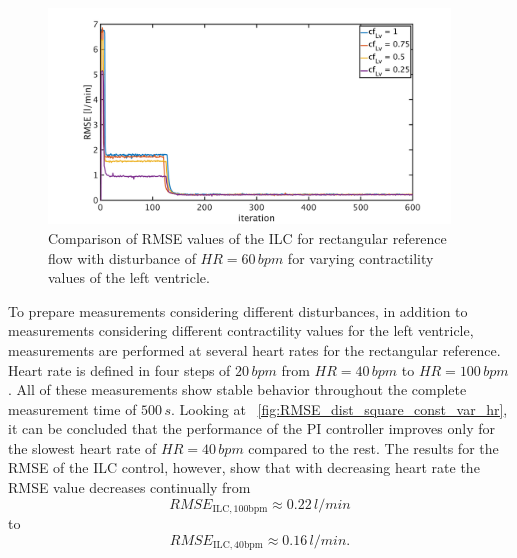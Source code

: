 \begin{figure}[ht!]
  \centering
  \includegraphics[width=0.95\textwidth]{images/chapt_5/ILC/RMSE_dist_square_60_var_cf.pdf}
  \caption[RMSE Comparison of ILC for a rectangular reference flow for varying left ventricular contractilities]{Comparison of RMSE values of the ILC for rectangular reference flow with disturbance of $HR=60\,bpm$ for varying contractility values of the left ventricle.}
  \label{fig:RMSE_dist_square_60_var_cf}
\end{figure}
To prepare measurements considering different disturbances, in addition to measurements considering different contractility values for the left ventricle, measurements are performed at several heart rates for the rectangular reference. Heart rate is defined in four steps of $20\,bpm$ from $HR=40\,bpm$ to $HR=100\,bpm$. All of these measurements show stable behavior throughout the complete measurement time of $500\,s$.
Looking at \figurename~\ref{fig:RMSE_dist_square_const_var_hr}, it can be concluded that the performance of the PI controller improves only for the slowest heart rate of $HR=40\,bpm$ compared to the rest.
The results for the RMSE of the ILC control, however, show that with decreasing heart rate the RMSE value decreases continually from
\begin{equation}
  RMSE_{\mathrm{ILC,100bpm}}\approx 0.22\,l/min
\end{equation}
to
\begin{equation}
  RMSE_{\mathrm{ILC,40bpm}}\approx 0.16\,l/min.
\end{equation}
